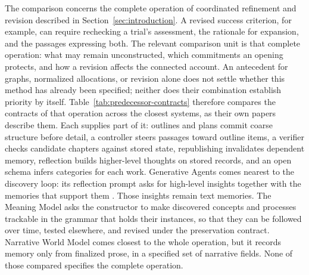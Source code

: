 \documentclass[11pt,a4paper]{article}
\begin{document}
The comparison concerns the complete operation of coordinated refinement and
revision described in Section~\ref{sec:introduction}. A revised success criterion,
for example, can require rechecking a
trial's assessment, the rationale for expansion, and the passages expressing
both. The relevant comparison unit is that complete operation: what may remain
unconstructed, which commitments an opening protects, and how a revision affects
the connected account. An antecedent for graphs, normalized allocations, or
revision alone does not settle whether this method has already been specified;
neither does their combination establish priority by itself.
Table~\ref{tab:predecessor-contracts} therefore compares the contracts of that
operation across the closest systems, as their own papers describe them. Each
supplies part of it: outlines and plans commit coarse structure before detail,
a controller steers passages toward outline items, a verifier checks candidate
chapters against stored state, republishing invalidates dependent memory,
reflection builds higher-level thoughts on stored records, and an open schema
infers categories for each work. Generative Agents comes nearest to the
discovery loop: its reflection prompt asks for high-level insights together with
the memories that support them \cite{park2023agents}. Those insights remain
text memories. The Meaning Model asks the constructor to make discovered
concepts and processes trackable in the grammar that holds their instances, so
that they can be followed over time, tested elsewhere, and revised under the
preservation contract. Narrative World Model comes closest to the whole
operation, but it records memory only from finalized prose, in a specified set
of narrative fields. None of those compared specifies the complete operation.
\end{document}
